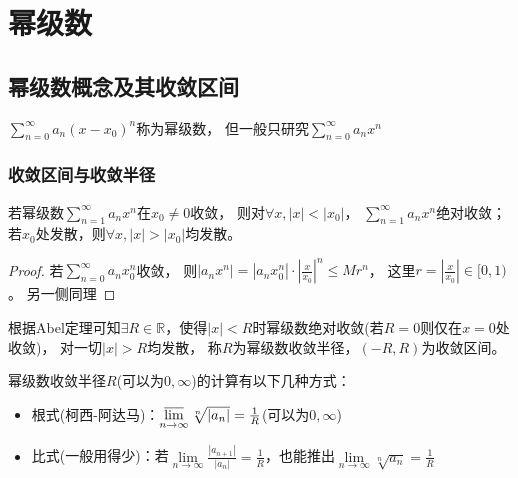 




\chapter{幂级数}

\section{幂级数概念及其收敛区间}

\begin{definition}[幂级数]
  $\sum\limits_{n = 0}^{\infty}a_n(x - x_0)^n$称为幂级数，
  但一般只研究$\sum\limits_{n = 0}^{\infty}a_nx^n$
\end{definition}

\subsection{收敛区间与收敛半径}

\begin{theorem}[Abel定理]
  若幂级数$\sum\limits_{n = 1}^{\infty}a_nx^n$在$x_0 \neq 0$收敛，
  则对$\forall x, |x| < |x_0|$，
  $\sum\limits_{n = 1}^{\infty}a_nx^n$绝对收敛；
  若$x_0$处发散，则$\forall x, |x| > |x_0|$均发散。
\end{theorem}

\begin{proof}
  若$\sum\limits_{n = 0}^{\infty}a_nx_0^n$收敛，
  则$|a_nx^n| = |a_nx_0^n| \cdot |\frac{x}{x_0}|^n \leq Mr^n$，
  这里$r = |\frac{x}{x_0}| \in [0,1)$。
  另一侧同理
\end{proof}


\begin{definition}[收敛半径]
  根据Abel定理可知$\exists R \in \mathbb{R}$，使得$|x| < R$时幂级数绝对收敛(若$R = 0$则仅在$x = 0$处收敛)，
  对一切$|x| > R$均发散，
  称$R$为幂级数收敛半径，$(-R,R)$为收敛区间。
\end{definition}

\begin{theorem}[收敛半径的计算]
  幂级数收敛半径$R$(可以为$0, \infty$)的计算有以下几种方式：
  \begin{itemize}
  \item 根式(柯西-阿达马)：$\varlimsup \limits _{n \rightarrow \infty}  \sqrt[n]{|a_n|} = \frac{1}{R}$(可以为$0,\infty$)
  \item 比式(一般用得少)：若$\lim \limits _{n \rightarrow \infty} \frac{|a_{n+1}|}{|a_n|} = \frac{1}{R}$，也能推出$\lim \limits _{n \rightarrow \infty} \sqrt[n]{a_n} = \frac{1}{R}$
  \end{itemize}
\end{theorem}

